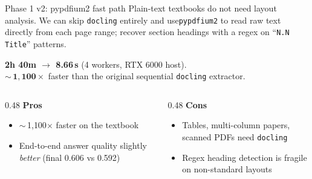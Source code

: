 \documentclass[aspectratio=169,11pt]{beamer}
\begin{document}
\begin{frame}{Phase 1 v2: pypdfium2 fast path}
Plain-text textbooks do not need layout analysis. We can skip \texttt{docling}
entirely and use\texttt{pypdfium2} to read raw text directly from each
page range; recover section headings with a regex on
``\texttt{N.N Title}'' patterns.

\bigskip

\begin{block}{}
\centering
\textbf{2h 40m $\rightarrow$ 8.66\,s} (4 workers, RTX 6000 host).
\\[0.4ex]
$\sim$\,$\mathbf{1{,}100\times}$ faster than the original sequential
\texttt{docling} extractor.
\end{block}

\bigskip

\begin{columns}[T,onlytextwidth]
\begin{column}{0.48\textwidth}
\textbf{Pros}
\begin{itemize}
  \item $\sim$\,1{,}100$\times$ faster on the textbook
  \item End-to-end answer quality slightly \emph{better}
        (final 0.606 vs 0.592)
\end{itemize}
\end{column}
\begin{column}{0.48\textwidth}
\textbf{Cons}
\begin{itemize}
  \item Tables, multi-column papers, scanned PDFs need
        \texttt{docling}
  \item Regex heading detection is fragile on non-standard layouts
\end{itemize}
\end{column}
\end{columns}

\end{frame}
\end{document}

